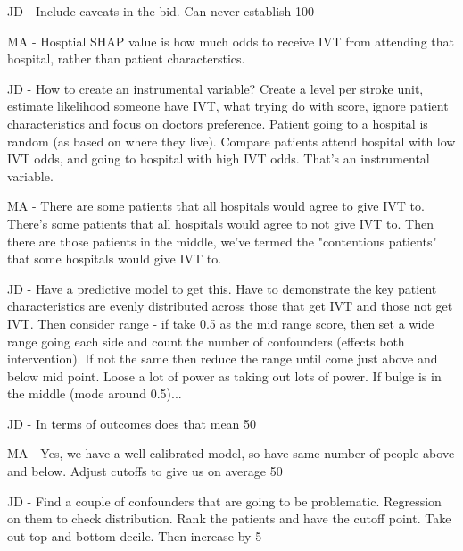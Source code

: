 JD - Include caveats in the bid. Can never establish 100%

MA - Hosptial SHAP value is how much odds to receive IVT from attending that hospital, rather than patient characterstics.

JD - How to create an instrumental variable? Create a level per stroke unit, estimate likelihood someone have IVT, what trying do with score, ignore patient characteristics and focus on doctors preference. Patient going to a hospital is random (as based on where they live). Compare patients attend hospital with low IVT odds, and going to hospital with high IVT odds. That's an instrumental variable.

MA - There are some patients that all hospitals would agree to give IVT to. There's some patients that all hospitals would agree to not give IVT to. Then there are those patients in the middle, we've termed the "contentious patients" that some hospitals would give IVT to.

JD - Have a predictive model to get this. Have to demonstrate the key patient characteristics are evenly distributed across those that get IVT and those not get IVT. Then consider range - if take 0.5 as the mid range score, then set a wide range going each side and count the number of confounders (effects both intervention). If not the same then reduce the range until come just above and below mid point.
Loose a lot of power as taking out lots of power. If bulge is in the middle (mode around 0.5)...

JD - In terms of outcomes does that mean 50%

MA - Yes, we have a well calibrated model, so have same number of people above and below. Adjust cutoffs to give us on average 50%

JD - Find a couple of confounders that are going to be problematic. Regression on them to check distribution.
Rank the patients and have the cutoff point. Take out top and bottom decile. Then increase by 5%

